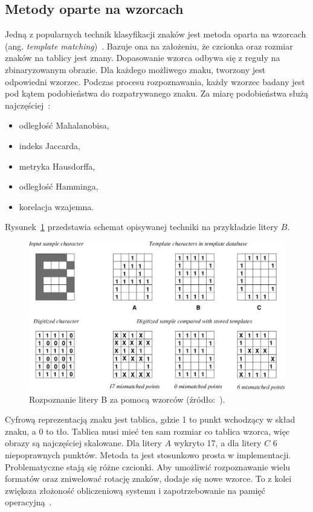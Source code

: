 \subsection{Metody oparte na wzorcach}
Jedną z popularnych technik klasyfikacji znaków jest metoda oparta na wzorcach (ang. \textit{template matching})~\cite{1219663, 1217917}.
Bazuje ona na założeniu, że czcionka oraz rozmiar znaków na tablicy jest znany.
Dopasowanie wzorca odbywa się z reguły na zbinaryzowanym obrazie.
Dla każdego możliwego znaku, tworzony jest odpowiedni wzorzec.
Podczas procesu rozpoznawania, każdy wzorzec badany jest pod kątem podobieństwa do rozpatrywanego znaku.
Za miarę podobieństwa służą najczęściej~\cite{9310202}:
\begin{itemize}
    \item odległość Mahalanobisa,
    \item indeks Jaccarda,
    \item metryka Hausdorffa,
    \item odległość Hamminga,
    \item korelacja wzajemna.
\end{itemize}
Rysunek~\ref{fig:ocr_template_matching} przedstawia schemat opisywanej techniki na przykładzie litery $B$.
\begin{figure}[!ht]
    \centering
    \includegraphics[scale=0.3]{Pictures/ocr_template}
    \caption{Rozpoznanie litery B za pomocą wzorców (źródło:~\cite{Li1993AnIO}).}
    \label{fig:ocr_template_matching}
\end{figure}
\FloatBarrier
Cyfrową reprezentacją znaku jest tablica, gdzie 1 to punkt wchodzący w skład znaku, a 0 to tło.
Tablica musi mieć ten sam rozmiar co tablica wzorca, więc obrazy są najczęściej skalowane.
Dla litery $A$ wykryto 17, a dla litery $C$ 6 niepoprawnych punktów.
Metoda ta jest stosunkowo prosta w implementacji.
Problematyczne stają się różne czcionki.
Aby umożliwić rozpoznawanie wielu formatów oraz zniwelować rotację znaków, dodaje się nowe wzorce.
To z kolei zwiększa złożoność obliczeniową systemu i zapotrzebowanie na pamięć operacyjną~\cite{9310202}.